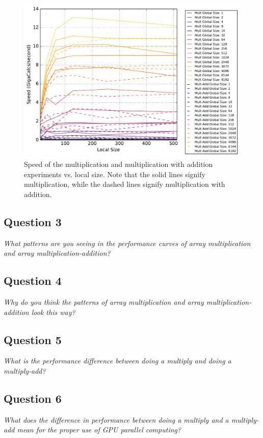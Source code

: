\documentclass{article}
\begin{document}
\begin{figure}[h]
	\centering
        \includegraphics[width=0.7\linewidth]{Mult_Localsize_2.pdf}
        \caption{Speed of the multiplication and multiplication with addition experiments vs. local size.  Note that the solid lines signify multiplication, while the dashed lines signify multiplication with addition.}
        \label{fig:MultLocal}
\end{figure}

\subsection*{Question 3}
\textit{What patterns are you seeing in the performance curves of array multiplication and array multiplication-addition?}



\subsection*{Question 4}
\textit{Why do you think the patterns of array multiplication and array multiplication-addition look this way?}



\subsection*{Question 5}
\textit{What is the performance difference between doing a multiply and doing a multiply-add?}



\subsection*{Question 6}
\textit{What does the difference in performance between doing a multiply and a multiply-add mean for the proper use of GPU parallel computing?}
\end{document}

